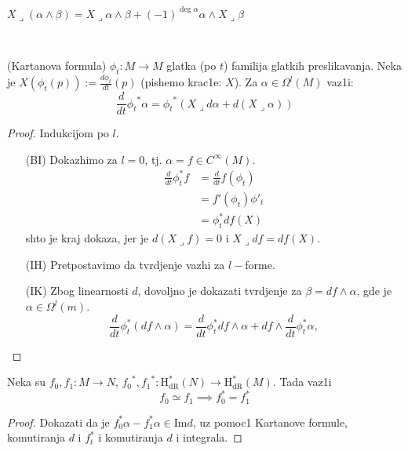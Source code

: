 \documentclass[a4paper,12pt]{article}
\newcommand{\hdr}[1]{\mathrm{H}_\mathrm{dR}^{#1}}
\begin{document}
\begin{tvr}
	$X\lrcorner(\alpha \wedge \beta) = X\lrcorner\alpha \wedge \beta + (-1)^{\deg \alpha} \alpha\wedge X\lrcorner \beta$
\end{tvr}\\

\begin{tvr}
(Kartanova formula) $\phi_t : M \to M$ glatka (po $t$) familija glatkih pre\-sli\-ka\-va\-nja. Neka je $X(\phi_t(p)) := \frac{d \phi_t}{dt} (p)$ (pishemo krac1e: $X$). Za $\alpha \in \Omega^l(M)$ vaz1i:
\[\frac{d}{dt} {\phi_t}^* \alpha = {\phi_t}^*(X \lrcorner d \alpha + d(X \lrcorner \alpha))\]
\end{tvr}
\begin{proof}
Indukcijom po $l$.
\begin{itemize}
	\item[(BI)] Dokazhimo za $l=0$, tj. $\alpha = f \in C^\infty(M)$.
		\begin{align*}
			\frac{d}{dt}\phi^*_t f &=  \frac{d}{dt} f(\phi_t) \\
			&=f'(\phi_t)\phi'_t\\
			&=\phi_t^* df(X)
		\end{align*}
	shto je kraj dokaza, jer je $d(X\lrcorner f) = 0$ i $X\lrcorner df = df(X)$.
	\item[(IH)] Pretpostavimo da tvrdjenje vazhi za $l-$forme.
	\item[(IK)] Zbog linearnosti $d$, dovoljno je dokazati tvrdjenje za $\beta = df \wedge \alpha$, gde je 
		$\alpha \in \Omega^l(m)$.
		\[\frac{d}{dt}\phi^*_t (df \wedge \alpha) = \frac{d}{dt}\phi^*_t df \wedge \alpha + df \wedge\frac{d}{dt}\phi^*_t  \alpha,   \] 
\end{itemize} \end{proof}

\begin{posl}
Neka su $f_0, f_1 : M \to N$, ${f_0}^*, {f_1}^* : \hdr{*}(N)\to \hdr{*}(M)$. Tada vaz1i 
\[f_0 \simeq f_1 \implies f_0^* = f_1^*\]
\end{posl}
\begin{proof}
	Dokazati da je $f_0^*\alpha - f_1^*\alpha \in \mathrm{Im} d$, uz pomoc1 Kartanove formule, komutiranja $d$ i $f_t^*$ i komutiranja $d$ i integrala.
\end{proof}
\end{document}
